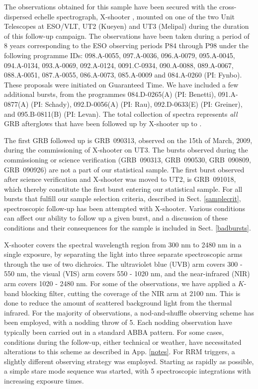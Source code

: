 \documentclass{aa}    %
\begin{document}
The observations obtained for this sample have been secured with the
cross-dispersed echelle spectrograph, X-shooter \citep{Vernet2011}, mounted on
one of the two Unit Telescopes at ESO/VLT, UT2 (Kueyen) and UT3 (Melipal) during
the duration of this follow-up campaign. The observations have been taken during
a period of 8 years corresponding to the ESO observing periods P84 through P98
under the following programme IDs: 098.A-0055, 097.A-0036, 096.A-0079,
095.A-0045, 094.A-0134, 093.A-0069, 092.A-0124, 0091.C-0934, 090.A-0088,
089.A-0067, 088.A-0051, 087.A-0055, 086.A-0073, 085.A-0009 and 084.A-0260 (PI:
Fynbo). These proposals were initiated on Guaranteed Time. We have included a
few additional bursts, from the programmes 084.D-0265(A) (PI: Benetti),
091.A-0877(A) (PI: Schady), 092.D-0056(A) (PI: Rau), 092.D-0633(E) (PI:
Greiner), and 095.B-0811(B) (PI: Levan). The total collection of spectra
represents \textit{all} GRB afterglows that have been followed up by X-shooter
up to \termdate.

The first GRB followed up is GRB~090313, observed on the 15th of March, 2009,
during the commissioning of X-shooter on UT3. The bursts observed during the
commissioning or science verification (GRB~090313, GRB~090530, GRB~090809,
GRB~090926) are not a part of our statistical sample. The first burst observed
after science verification and X-shooter was moved to UT2, is GRB~091018, which
thereby constitute the first burst entering our statistical sample. For all
bursts that fulfill our sample selection criteria, described in Sect.
\ref{samplecrit}, spectroscopic follow-up has been attempted with X-shooter.
Various conditions can affect our ability to follow up a given burst, and a
discussion of these conditions and their consequences for the sample is
included in Sect. \ref{badbursts}.

X-shooter covers the spectral wavelength region from 300 nm to 2480 nm in a
single exposure, by separating the light into three separate spectroscopic arms
through the use of two dichroics. The ultraviolet blue (UVB) arm covers 300 -
550 nm, the visual (VIS) arm covers 550 - 1020 nm, and the near-infrared (NIR)
arm covers 1020 - 2480 nm. For some of the observations, we have applied a
$K$-band blocking filter, cutting the coverage of the NIR arm at 2100 nm. This
is done to reduce the amount of scattered background light from the thermal
infrared. For the majority of observations, a nod-and-shuffle observing scheme
has been employed, with a nodding throw of 5\arcsec. Each nodding observation
have typically been carried out in a standard ABBA pattern. For some cases,
conditions during the follow-up, either technical or weather, have necessitated
alterations to this scheme as described in App. \ref{notes}. For RRM triggers, a
slightly different observing strategy was employed. Starting as rapidly as
possible, a simple stare mode sequence was started, with 5 spectroscopic
integrations with increasing exposure times. 
\end{document}
